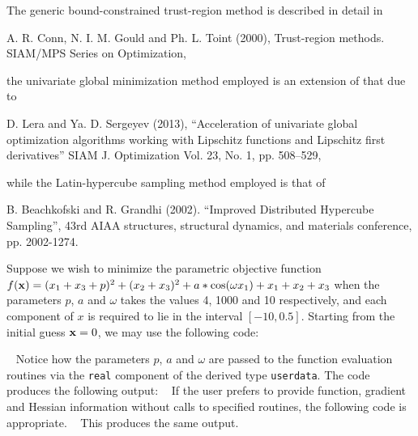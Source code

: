 \documentclass{galahad}
\begin{document}
\galreferences
\vspace*{1mm}

\noindent
The generic bound-constrained trust-region method is described in detail in
\vspace*{1mm}

\noindent
A. R. Conn, N. I. M. Gould and Ph. L. Toint (2000),
Trust-region methods.
SIAM/MPS Series on Optimization,

\noindent
the univariate global minimization method employed is an extension of that
due to
\vspace*{1mm}

\noindent
D. Lera and Ya. D. Sergeyev (2013),
``Acceleration of univariate global optimization algorithms working with
Lipschitz functions and Lipschitz first derivatives''
SIAM J. Optimization Vol. 23, No. 1, pp. 508–529,

\noindent
while the Latin-hypercube sampling method employed is that of
\vspace*{1mm}

\noindent
B. Beachkofski and R. Grandhi (2002).
``Improved Distributed Hypercube Sampling'',
43rd AIAA structures, structural dynamics, and materials conference,
pp. 2002-1274.


\galexamples
Suppose we wish to minimize the parametric objective function
$f({\mathbf{x}}) = ( x_1 + x_3 + p )^2 + ( x_2 + x_3 )^2 + a * \cos( \omega x_1 ) +     
x_1 + x_2 + x_3$
when the parameters $p$, $a$ and $\omega$ takes the values 4, 1000 and 10
respectively, and each component of $x$ is required to lie in the interval
$[-10,0.5]$.
Starting from the initial guess ${\mathbf{x}} = 0$, we may use the following code:

{\tt \small
\VerbatimInput{\packageexample}
}
\noindent
Notice how the parameters $p$, $a$ and $\omega$ are passed to the function 
evaluation routines via the {\tt real} component of the derived type 
{\tt userdata}.
The code produces the following output:
{\tt \small
\VerbatimInput{\packageresults}
}
\noindent
If the user prefers to provide function, gradient and Hessian information
without calls to specified routines, the following code is appropriate.
{\tt \small
\VerbatimInput{\packageexampleb}
}
\noindent
This produces the same output.
\end{document}
